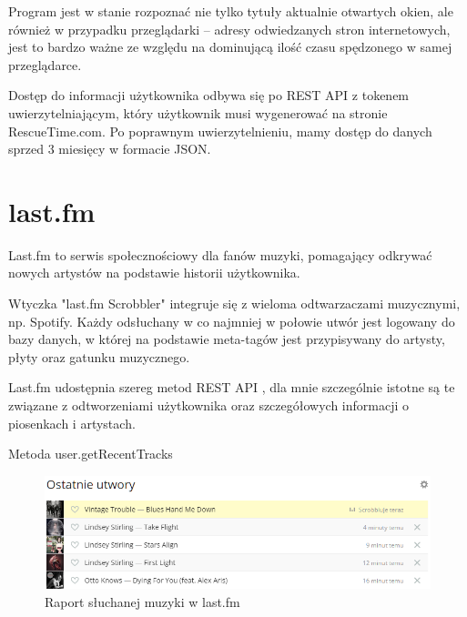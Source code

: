 \documentclass[brudnopis]{xmgr}
\begin{document}
            Program jest w stanie rozpoznać nie tylko tytuły aktualnie otwartych okien,
            ale również w przypadku przeglądarki – adresy odwiedzanych stron internetowych,
            jest to bardzo ważne ze względu na dominującą ilość czasu spędzonego w samej przeglądarce.

            Dostęp do informacji użytkownika odbywa się po REST API z tokenem uwierzytelniającym,
            który użytkownik musi wygenerować na stronie RescueTime.com.
            Po poprawnym uwierzytelnieniu, mamy dostęp do danych sprzed 3 miesięcy w formacie JSON.

        \section*{last.fm}

            Last.fm to serwis społecznościowy dla fanów muzyki,
            pomagający odkrywać nowych artystów na podstawie historii użytkownika.

            Wtyczka "last.fm Scrobbler"\cite{lastfm:trackmymusic} integruje się z wieloma odtwarzaczami muzycznymi, np. Spotify.
            Każdy odsłuchany w co najmniej w połowie utwór jest logowany do bazy danych,
            w której na podstawie meta-tagów jest przypisywany do artysty, płyty oraz gatunku muzycznego.

            Last.fm udostępnia szereg metod REST API \cite{lastfm:apidoc},
            dla mnie szczególnie istotne są te związane z odtworzeniami użytkownika oraz szczegółowych informacji o piosenkach i artystach.

            Metoda user.getRecentTracks %


        \begin{figure}
          \includegraphics[width=\linewidth]{fig/lastfm-now-listening.png}
          \caption{Raport słuchanej muzyki w last.fm}
          \label{fig:Last.fm}
        \end{figure}
\end{document}
